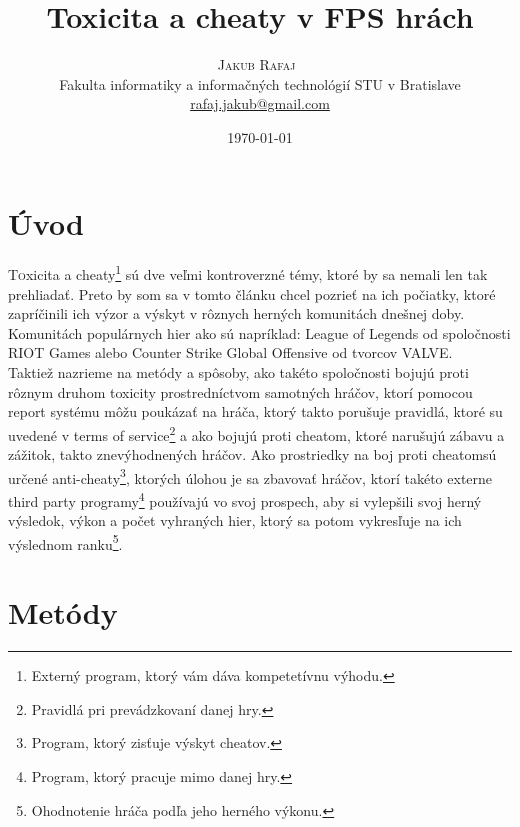 \documentclass[twoside,twocolumn]{article}
\title{Toxicita a cheaty v FPS hrách} %
\author{%
\textsc{Jakub Rafaj}\
\\[1ex]
\normalsize Fakulta informatiky a informačných technológií STU v Bratislave  \\%
\normalsize \href{mailto:rafaj.jakub@gmail.com}{rafaj.jakub@gmail.com} %
}
\date{\today} %
\begin{document}
\maketitle


\section{Úvod}

\lettrine[nindent=0em,lines=3]{T}oxicita a cheaty\footnote[1]{Externý program, ktorý vám dáva kompetetívnu výhodu.} sú dve veľmi kontroverzné témy, ktoré by sa nemali len tak prehliadať. Preto by som sa v tomto článku chcel pozrieť na ich počiatky, ktoré zapríčinili ich výzor a výskyt v rôznych herných komunitách dnešnej doby. Komunitách populárnych hier ako sú napríklad: League of Legends od spoločnosti RIOT Games alebo Counter Strike Global Offensive od tvorcov VALVE.\\
Taktiež nazrieme na metódy a spôsoby, ako takéto spoločnosti bojujú proti rôznym druhom toxicity prostredníctvom samotných hráčov, ktorí pomocou report systému môžu poukázať na hráča, ktorý takto porušuje pravidlá, ktoré su uvedené v terms of service\footnote[2]{Pravidlá pri prevádzkovaní danej hry.} a ako bojujú proti cheatom\footnotemark[1], ktoré narušujú zábavu a zážitok, takto znevýhodnených hráčov. Ako prostriedky na boj proti cheatom\footnotemark[1] sú určené anti-cheaty\footnote[3]{Program, ktorý zisťuje výskyt cheatov.}, ktorých úlohou je sa zbavovať hráčov, ktorí takéto externe third party programy\footnote[4]{Program, ktorý pracuje mimo danej hry.} používajú vo svoj prospech, aby si vylepšili svoj herný výsledok, výkon a počet vyhraných hier, ktorý sa potom vykresľuje na ich výslednom ranku\footnote[5]{Ohodnotenie hráča podľa jeho herného výkonu.}.\\


\section{Metódy}
\end{document}
